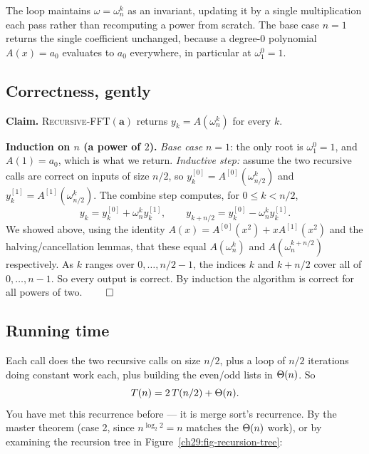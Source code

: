 The loop maintains $\omega = \omega_n^k$ as an invariant, updating it by a
single multiplication each pass rather than recomputing a power from scratch. The
base case $n=1$ returns the single coefficient unchanged, because a degree-$0$
polynomial $A(x)=a_0$ evaluates to $a_0$ everywhere, in particular at $\omega_1^0=1$.

\subsection{Correctness, gently}

\begin{formalbox}
\textbf{Claim.} \textsc{Recursive-FFT}$(\mathbf{a})$ returns $y_k = A(\omega_n^k)$
for every $k$.

\textbf{Induction on $n$ (a power of $2$).}
\emph{Base case} $n=1$: the only root is $\omega_1^0=1$, and $A(1)=a_0$, which is
what we return. \emph{Inductive step:} assume the two recursive calls are correct
on inputs of size $n/2$, so $y^{[0]}_k = A^{[0]}(\omega_{n/2}^k)$ and
$y^{[1]}_k = A^{[1]}(\omega_{n/2}^k)$. The combine step computes, for
$0\le k<n/2$,
\[
y_k = y^{[0]}_k + \omega_n^k y^{[1]}_k,\qquad
y_{k+n/2} = y^{[0]}_k - \omega_n^k y^{[1]}_k.
\]
We showed above, using the identity $A(x)=A^{[0]}(x^2)+x A^{[1]}(x^2)$ and the
halving/cancellation lemmas, that these equal $A(\omega_n^k)$ and
$A(\omega_n^{k+n/2})$ respectively. As $k$ ranges over $0,\dots,n/2-1$, the indices
$k$ and $k+n/2$ cover all of $0,\dots,n-1$. So every output is correct. By
induction the algorithm is correct for all powers of two. $\qed$
\end{formalbox}

\subsection{Running time}

Each call does the two recursive calls on size $n/2$, plus a loop of $n/2$
iterations doing constant work each, plus building the even/odd lists in $\Theta(n)$.
So
\[
T(n) = 2\,T(n/2) + \Theta(n).
\]
You have met this recurrence before --- it is merge sort's recurrence. By the master
theorem (case 2, since $n^{\log_2 2} = n$ matches the $\Theta(n)$ work), or by examining
the recursion tree in Figure~\ref{ch29:fig-recursion-tree}:

